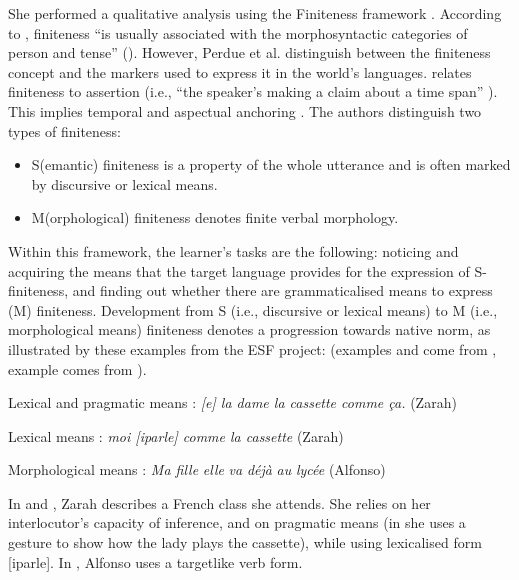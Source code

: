 \documentclass[output=paper,colorlinks,citecolor=brown,modfonts,nonflat]{../langscibook}
\begin{document}
She performed a qualitative analysis using the Finiteness framework \citep{Klein2006}. According to \citet{Klein2006,GretschPerdue2007,PerdueEtAl2002}, finiteness “is usually associated with the morphosyntactic categories of person and tense” (\citealt[853]{PerdueEtAl2002}). However, Perdue et al. distinguish between the finiteness concept and the markers used to express it in the world’s languages. \citet{Klein1994} relates finiteness to assertion (i.e., “the speaker’s making a claim about a time span” \citealt[853]{PerdueEtAl2002}). This implies temporal and aspectual anchoring \citep{Klein1994}. The authors distinguish two types of finiteness:

\begin{itemize}
  \item S(emantic) finiteness is a property of the whole utterance and is often marked by discursive or lexical means.
  \item M(orphological) finiteness denotes finite verbal morphology.
\end{itemize}



Within this framework, the learner’s tasks are the following:  noticing and acquiring the means that the target language provides for the expression of S-finiteness, and  finding out whether there are grammaticalised means to express (M) finiteness. Development from S (i.e., discursive or lexical means) to M (i.e., morphological means) finiteness denotes a progression towards native norm, as illustrated by these examples from the ESF project: (examples  and  come from \citealt{Véronique2004}, example  comes from \citealt{Granget2015}).

\begin{exe}
\ex%
    \label{ex:leclerq:10}
         Lexical and pragmatic means :
         \textit{[e] la dame la cassette comme ça.}
         (Zarah)

\ex%
    \label{ex:leclerq:11}
         Lexical means :
         \textit{moi [iparle] comme la cassette}
         (Zarah)

\ex%
    \label{ex:leclerq:12}
         Morphological means :
         \textit{Ma fille} \textit{elle} \textit{va} \textit{déjà} \textit{au} \textit{lycée}
         (Alfonso)
\end{exe}

In  and , Zarah describes a French class she attends. She relies on her interlocutor’s capacity of inference, and on pragmatic means (in  she uses a gesture to show how the lady plays the cassette), while using lexicalised form [iparle]. In , Alfonso uses a targetlike verb form.
\end{document}
